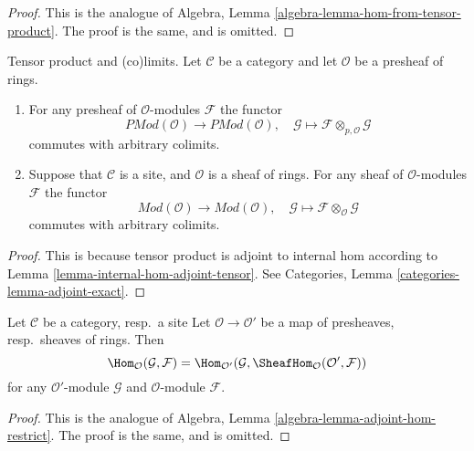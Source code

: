 \begin{proof}
This is the analogue of
Algebra, Lemma \ref{algebra-lemma-hom-from-tensor-product}.
The proof is the same, and is omitted.
\end{proof}

\begin{lemma}
\label{lemma-tensor-commute-colimits}
Tensor product and (co)limits.
Let $\mathcal{C}$ be a category and let $\mathcal{O}$ be a presheaf of rings.
\begin{enumerate}
\item For any presheaf of $\mathcal{O}$-modules $\mathcal{F}$ the functor
$$
\textit{PMod}(\mathcal{O}) \longrightarrow \textit{PMod}(\mathcal{O})
, \quad
\mathcal{G} \longmapsto \mathcal{F} \otimes_{p, \mathcal{O}} \mathcal{G}
$$
commutes with arbitrary colimits.
\item
Suppose that $\mathcal{C}$ is a site, and $\mathcal{O}$ is a sheaf of rings.
For any sheaf of $\mathcal{O}$-modules $\mathcal{F}$ the functor
$$
\textit{Mod}(\mathcal{O}) \longrightarrow \textit{Mod}(\mathcal{O})
, \quad
\mathcal{G} \longmapsto \mathcal{F} \otimes_\mathcal{O} \mathcal{G}
$$
commutes with arbitrary colimits.
\end{enumerate}
\end{lemma}

\begin{proof}
This is because tensor product is adjoint to internal hom according
to Lemma \ref{lemma-internal-hom-adjoint-tensor}.
See Categories, Lemma \ref{categories-lemma-adjoint-exact}.
\end{proof}

\begin{lemma}
\label{lemma-adjoint-hom-restrict}
Let $\mathcal{C}$ be a category, resp.\ a site
Let $\mathcal{O} \to \mathcal{O}'$ be a map of presheaves, resp.\ sheaves
of rings. Then
$$
\Hom_\mathcal{O}(\mathcal{G}, \mathcal{F}) =
\Hom_{\mathcal{O}'}(\mathcal{G},
\SheafHom_\mathcal{O}(\mathcal{O}', \mathcal{F}))
$$
for any $\mathcal{O}'$-module $\mathcal{G}$ and $\mathcal{O}$-module
$\mathcal{F}$.
\end{lemma}

\begin{proof}
This is the analogue of
Algebra, Lemma \ref{algebra-lemma-adjoint-hom-restrict}.
The proof is the same, and is omitted.
\end{proof}











